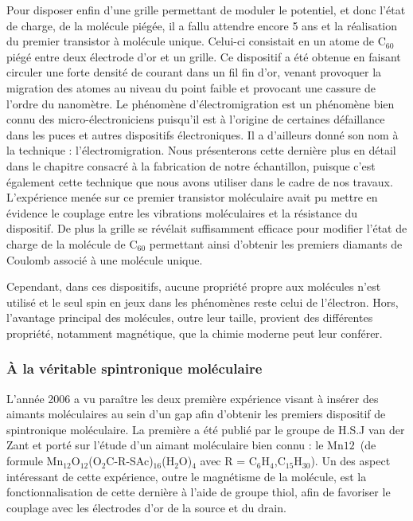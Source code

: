 Pour disposer enfin d'une grille permettant de moduler le potentiel, et donc l'état de charge, de la molécule piégée, il a fallu attendre encore 5 ans et la réalisation du premier transistor à molécule unique. Celui-ci consistait en un atome de C$_{60}$ piégé entre deux électrode d'or et un grille. Ce dispositif a été obtenue en faisant circuler une forte densité de courant dans un fil fin d'or, venant provoquer la migration des atomes au niveau du point faible et provocant une cassure de l'ordre du nanomètre. Le phénomène d'électromigration est un phénomène bien connu des micro-électroniciens puisqu'il est à l'origine de certaines défaillance dans les puces et autres dispositifs électroniques. Il a d'ailleurs donné son nom à la technique : l'électromigration. Nous présenterons cette dernière plus en détail dans le chapitre consacré à la fabrication de notre échantillon, puisque c'est également cette technique que nous avons utiliser dans le cadre de nos travaux. L'expérience menée sur ce premier transistor moléculaire avait pu mettre en évidence le couplage entre les vibrations moléculaires et la résistance du dispositif. De plus la grille se révélait suffisamment efficace pour modifier l'état de charge de la molécule de C$_{60}$ permettant ainsi d'obtenir les premiers diamants de Coulomb associé à une molécule unique.

Cependant, dans ces dispositifs, aucune propriété propre aux molécules n'est utilisé et le seul spin en jeux dans les phénomènes reste celui de l'électron. Hors, l'avantage principal des molécules, outre leur taille, provient des différentes propriété, notamment magnétique, que la chimie moderne peut leur  conférer.

\subsubsection*{\`A la véritable spintronique moléculaire}
L'année 2006 a vu paraître les deux première expérience visant à insérer des aimants moléculaires au sein d'un gap afin d'obtenir les premiers dispositif de spintronique moléculaire. La première a été publié par le groupe de H.S.J van der Zant et porté sur l'étude d'un aimant moléculaire bien connu : le Mn${12}$~(de formule Mn$_{12}$O$_{12}$(O$_{2}$C-R-SAc)$_{16}$(H$_{2}$O)$_{4}$ avec R = {C$_6$H$_4$,C$_{15}$H$_{30}$}). Un des aspect intéressant de cette expérience, outre le magnétisme de la molécule, est la fonctionnalisation de cette dernière à l'aide de groupe thiol, afin de favoriser le couplage avec les électrodes d'or de la source et du drain.

